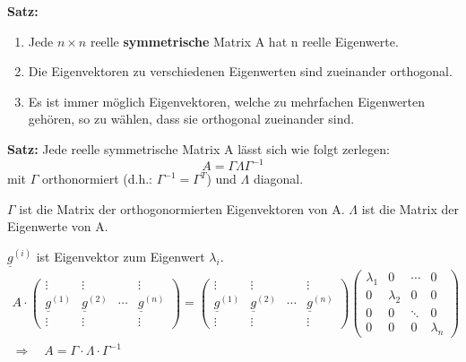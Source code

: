 \textbf{Satz:}
\begin{enumerate}
  \item Jede $n\times n$ reelle \textbf{symmetrische} Matrix A hat n reelle Eigenwerte.
  \item Die Eigenvektoren zu verschiedenen Eigenwerten sind zueinander orthogonal.
  \item Es ist immer m\"oglich Eigenvektoren, welche zu mehrfachen Eigenwerten geh\"oren, so zu
	w\"ahlen, dass sie orthogonal zueinander sind.
\end{enumerate}

\textbf{Satz:} Jede reelle symmetrische Matrix A l\"asst sich wie folgt zerlegen:
\begin{equation}
  A = \Gamma\Lambda\Gamma^{-1}
\end{equation}
mit $\Gamma$ orthonormiert (d.h.: $\Gamma^{-1}=\Gamma^T$) und $\Lambda$ diagonal.

$\Gamma$ ist die Matrix der orthogonormierten Eigenvektoren von A. $\Lambda$ ist die Matrix der Eigenwerte von A.

$\underline{g}^{(i)}$ ist Eigenvektor zum Eigenwert $\lambda_i$.
\begin{gather}
  A\cdot\begin{pmatrix}
		\vdots              & \vdots              &         & \vdots              \\
		\underline{g}^{(1)} & \underline{g}^{(2)} & \cdots  & \underline{g}^{(n)} \\
		\vdots              & \vdots              &         & \vdots
	\end{pmatrix} =
	\begin{pmatrix}
		\vdots              & \vdots              &         & \vdots              \\
		\underline{g}^{(1)} & \underline{g}^{(2)} & \cdots  & \underline{g}^{(n)} \\
		\vdots              & \vdots              &         & \vdots
	\end{pmatrix}
	\begin{pmatrix}
		\lambda_1 & 0         & \cdots & 0 \\
		0         & \lambda_2 & 0      & 0 \\ 
		0         & 0         & \ddots & 0 \\
		0         & 0         & 0      & \lambda_n
	\end{pmatrix} \\
  \Longrightarrow\quad A = \Gamma\cdot\Lambda\cdot\Gamma^{-1}
\end{gather}

